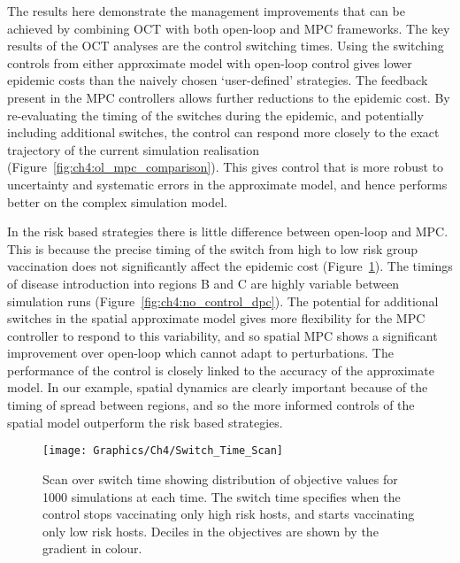 The results here demonstrate the management improvements that can be achieved by combining OCT with both open-loop and MPC frameworks. The key results of the OCT analyses are the control switching times. Using the switching controls from either approximate model with open-loop control gives lower epidemic costs than the naively chosen `user-defined' strategies. The feedback present in the MPC controllers allows further reductions to the epidemic cost. By re-evaluating the timing of the switches during the epidemic, and potentially including additional switches, the control can respond more closely to the exact trajectory of the current simulation realisation (Figure~\ref{fig:ch4:ol_mpc_comparison}). This gives control that is more robust to uncertainty and systematic errors in the approximate model, and hence performs better on the complex simulation model.

In the risk based strategies there is little difference between open-loop and MPC\@. This is because the precise timing of the switch from high to low risk group vaccination does not significantly affect the epidemic cost (Figure~\ref{fig:ch4:switch_time_scan}). The timings of disease introduction into regions B and C are highly variable between simulation runs (Figure~\ref{fig:ch4:no_control_dpc}). The potential for additional switches in the spatial approximate model gives more flexibility for the MPC controller to respond to this variability, and so spatial MPC shows a significant improvement over open-loop which cannot adapt to perturbations. The performance of the control is closely linked to the accuracy of the approximate model. In our example, spatial dynamics are clearly important because of the timing of spread between regions, and so the more informed controls of the spatial model outperform the risk based strategies.

\begin{figure}[h]
    \begin{center}
        \texttt{[image: Graphics/Ch4/Switch\_Time\_Scan]}
        \caption{Scan over switch time showing distribution of objective values for 1000 simulations at each time. The switch time specifies when the control stops vaccinating only high risk hosts, and starts vaccinating only low risk hosts. Deciles in the objectives are shown by the gradient in colour.}
        \label{fig:ch4:switch_time_scan}
    \end{center}
\end{figure}

\FloatBarrier


